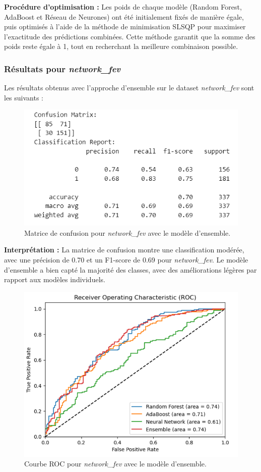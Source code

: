 \textbf{Procédure d'optimisation :} Les poids de chaque modèle (Random Forest, AdaBoost et Réseau de Neurones) ont été initialement fixés de manière égale, puis optimisés à l'aide de la méthode de minimisation SLSQP pour maximiser l'exactitude des prédictions combinées. Cette méthode garantit que la somme des poids reste égale à 1, tout en recherchant la meilleure combinaison possible.

\subsubsection{Résultats pour \textit{network\_fev}}

Les résultats obtenus avec l'approche d'ensemble sur le dataset \textit{network\_fev} sont les suivants :

\begin{figure}[H]
    \centering
    \includegraphics[width=0.6\linewidth]{capture_modele_21.png}
    \caption{Matrice de confusion pour \textit{network\_fev} avec le modèle d'ensemble.}
\end{figure}

\textbf{Interprétation :} La matrice de confusion montre une classification modérée, avec une précision de 0.70 et un F1-score de 0.69 pour \textit{network\_fev}. Le modèle d'ensemble a bien capté la majorité des classes, avec des améliorations légères par rapport aux modèles individuels.

\begin{figure}[H]
    \centering
    \includegraphics[width=0.7\linewidth]{capture_modele_22.png}
    \caption{Courbe ROC pour \textit{network\_fev} avec le modèle d'ensemble.}
\end{figure}


